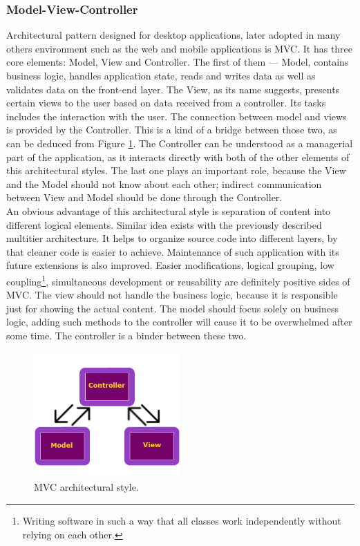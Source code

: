 \documentclass{article} %
\begin{document}
\subsubsection{Model-View-Controller}
Architectural pattern designed for desktop applications, later adopted in many others environment such as the web and mobile applications is MVC. It has three core elements: Model, View and Controller. The first of them --- Model, contains business logic, handles application state, reads and writes data as well as validates data on the front-end layer. The View, as its name suggests, presents certain views to the user based on data received from a controller. Its tasks includes the interaction with the user. The connection between model and views is provided by the Controller. This is a kind of a bridge between those two, as can be deduced from Figure \ref{fig:mvc}. The Controller can be understood as a managerial part of the application, as it interacts directly with both of the other elements of this architectural styles. The last one plays an important role, because the View and the Model should not know about each other; indirect communication between View and Model should be done through the Controller.\\
\newline
An obvious advantage of this architectural style is separation of content into different logical elements. Similar idea exists with the previously described multitier architecture. It helps to organize source code into different layers, by that cleaner code is easier to achieve. Maintenance of such application with its future extensions is also improved. Easier modifications, logical grouping, low coupling\footnote{Writing software in such a way that all classes work independently without relying on each other.}, simultaneous development or reusability are definitely positive sides of MVC. The view should not handle the business logic, because it is responsible just for showing the actual content. The model should focus solely on business logic, adding such methods to the controller will cause it to be overwhelmed after some time. The controller is a binder between these two.
\begin{figure}[ht]
  \centering
      \includegraphics[width=0.5\textwidth]{mvc.png}
  \caption{MVC architectural style.}
  \label{fig:mvc}
\end{figure}
\end{document}
